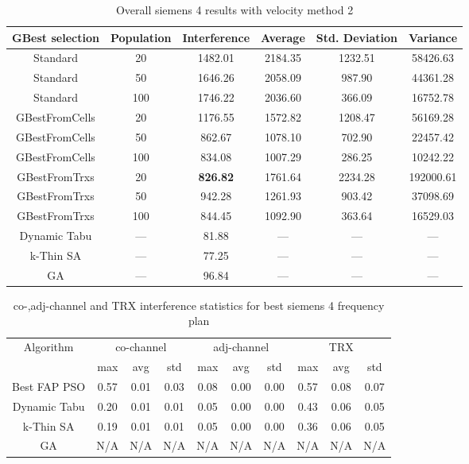 \begin{table}[H]
\centering
	\begin{tabular}{cccccc}
	\toprule
    GBest selection & Population & Interference & Average & Std. Deviation & Variance \\
    \midrule
    Standard & 20 & 1482.01 & 2184.35 & 1232.51 & 58426.63\\
    Standard & 50 & 1646.26 & 2058.09 & 987.90 & 44361.28\\
    Standard & 100 & 1746.22 & 2036.60 & 366.09 & 16752.78\\
    GBestFromCells & 20 & 1176.55 & 1572.82 & 1208.47 & 56169.28\\
    GBestFromCells & 50 & 862.67 & 1078.10 & 702.90 & 22457.42\\
    GBestFromCells & 100 & 834.08 & 1007.29 & 286.25 & 10242.22\\
    GBestFromTrxs & 20 & \textbf{826.82} & 1761.64 & 2234.28 & 192000.61\\
    GBestFromTrxs & 50 & 942.28 & 1261.93 & 903.42 & 37098.69\\
    GBestFromTrxs & 100 & 844.45 & 1092.90 & 363.64 & 16529.03\\
    \midrule
    Dynamic Tabu & --- & 81.88 & --- & --- & --- \\
    k-Thin SA & --- & 77.25 & --- & ---  & ---\\
    GA & --- & 96.84 & --- & ---  & ---\\
    \bottomrule
	\end{tabular}
\caption{Overall siemens 4 results with velocity method 2}
\label{tab:siem4m2}
\end{table}
\begin{table}[H]
\centering
	\begin{tabular}{cccccccccc}
	\toprule
    Algorithm & \multicolumn{3}{c}{co-channel} & \multicolumn{3}{c}{adj-channel} & \multicolumn{3}{c}{TRX}\\
              & max & avg & std
              & max & avg & std
              & max & avg & std\\
    \midrule
    Best FAP PSO & 0.57 & 0.01 & 0.03 & 0.08 & 0.00 & 0.00 & 0.57 & 0.08 & 0.07\\
    Dynamic Tabu & 0.20 & 0.01 & 0.01 & 0.05 & 0.00 & 0.00 & 0.43 & 0.06 & 0.05\\
    k-Thin SA & 0.19 & 0.01 & 0.01 & 0.05 & 0.00 & 0.00 & 0.36 & 0.06 & 0.05\\
    GA & \scriptsize{N/A} & \scriptsize{N/A} & \scriptsize{N/A} & \scriptsize{N/A} & \scriptsize{N/A} & \scriptsize{N/A} & \scriptsize{N/A} & \scriptsize{N/A} & \scriptsize{N/A}\\
    \bottomrule
	\end{tabular}
\caption{co-,adj-channel and TRX interference statistics for best siemens 4 frequency plan}
\label{tab:stats-siem4m1}
\end{table}
